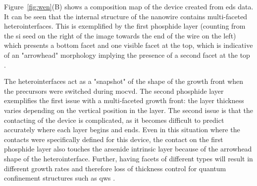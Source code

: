 Figure~\ref{fig:wen}(B) shows a composition map of the device created from \acf{eds} data. It can be seen that the internal structure of the nanowire contains multi-faceted heterointerfaces. This is exemplified by the first phosphide layer (counting from the \acl{si} seed on the right of the image towards the end of the wire on the left) which presents a bottom  facet and one visible  facet at the top, which is indicative of an "arrowhead" morphology implying the presence of a second  facet at the top \cite{Knoedler2017, Borg2015, Borg2019}. 

The heterointerfaces act as a "snapshot" of the shape of the growth front when the precursors were switched during \acf{mocvd}. The second phosphide layer exemplifies the first issue with a multi-faceted growth front: the layer thickness varies depending on the vertical position in the layer. The second issue is that the contacting of the device is complicated, as it becomes difficult to predict accurately where each layer begins and ends. Even in this situation where the contacts were specifically defined for this device, the contact on the first phosphide layer also touches the arsenide intrinsic layer because of the arrowhead shape of the heterointerface. Further, having facets of different types will result in different growth rates and therefore loss of thickness control for quantum confinement structures such as \acl{qw}s \cite{Han2020}.

